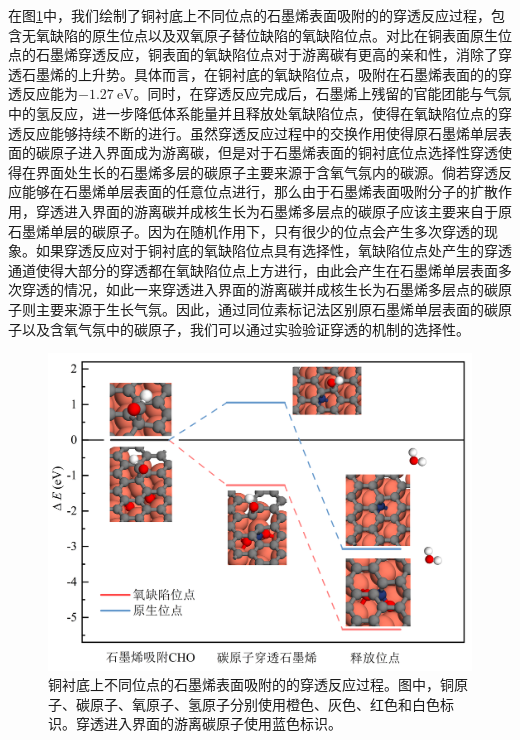 在图\ref{fig:FLG_DFT_CHOpene}中，我们绘制了铜衬底上不同位点的石墨烯表面吸附的的穿透反应过程，包含无氧缺陷的原生位点以及双氧原子替位缺陷的氧缺陷位点。对比在铜表面原生位点的石墨烯穿透反应，铜表面的氧缺陷位点对于游离碳有更高的亲和性，消除了穿透石墨烯的上升势。具体而言，在铜衬底的氧缺陷位点，吸附在石墨烯表面的的穿透反应能为$\SI{-1.27}{\electronvolt}$。同时，在穿透反应完成后，石墨烯上残留的官能团能与气氛中的氢反应，进一步降低体系能量并且释放处氧缺陷位点，使得在氧缺陷位点的穿透反应能够持续不断的进行。虽然穿透反应过程中的交换作用使得原石墨烯单层表面的碳原子进入界面成为游离碳，但是对于石墨烯表面的铜衬底位点选择性穿透使得在界面处生长的石墨烯多层的碳原子主要来源于含氧气氛内的碳源。倘若穿透反应能够在石墨烯单层表面的任意位点进行，那么由于石墨烯表面吸附分子的扩散作用，穿透进入界面的游离碳并成核生长为石墨烯多层点的碳原子应该主要来自于原石墨烯单层的碳原子。因为在随机作用下，只有很少的位点会产生多次穿透的现象。如果穿透反应对于铜衬底的氧缺陷位点具有选择性，氧缺陷位点处产生的穿透通道使得大部分的穿透都在氧缺陷位点上方进行，由此会产生在石墨烯单层表面多次穿透的情况，如此一来穿透进入界面的游离碳并成核生长为石墨烯多层点的碳原子则主要来源于生长气氛。因此，通过同位素标记法区别原石墨烯单层表面的碳原子以及含氧气氛中的碳原子，我们可以通过实验验证穿透的机制的选择性。
\begin{figure}[!htb]
    \includegraphics{pic/FLG_DFT_CHOpene.png}
    \caption{铜衬底上不同位点的石墨烯表面吸附的的穿透反应过程。图中，铜原子、碳原子、氧原子、氢原子分别使用橙色、灰色、红色和白色标识。穿透进入界面的游离碳原子使用蓝色标识。}
    \label{fig:FLG_DFT_CHOpene}
\end{figure}


